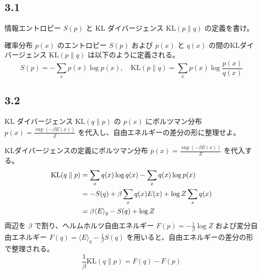 \documentclass[11pt,a4paper,dvipdfmx]{article}
\numberwithin{equation}{section}
\newenvironment{note}[0]
{
    \begin{tcolorbox}[sharp corners, colframe=gray!20, colback=gray!20, width=\textwidth]
}
{
    \end{tcolorbox}
}
\begin{document}
\subsection*{3.1}
\begin{note}
情報エントロピー $S(p)$ と KL ダイバージェンス $\text{KL}(p \parallel q)$ の定義を書け。
\end{note}
\begin{proofbox}
確率分布 $p(x)$ のエントロピー $S(p)$ および $p(x)$ と $q(x)$ の間のKLダイバージェンス $\text{KL}(p \parallel q)$ は以下のように定義される。
\begin{equation}
S(p) = - \sum_{x} p(x) \log p(x), \quad \text{KL}(p \parallel q) = \sum_{x} p(x) \log \frac{p(x)}{q(x)}
\end{equation}
\end{proofbox}

\subsection*{3.2}
\begin{note}
KL ダイバージェンス $\text{KL}(q \parallel p)$ の $p(x)$ にボルツマン分布 $p(x) = \frac{\exp(-\beta E(x))}{Z}$ を代入し、自由エネルギーの差分の形に整理せよ。
\end{note}
\begin{proofbox}
KLダイバージェンスの定義にボルツマン分布 $p(x) = \frac{\exp(-\beta E(x))}{Z}$ を代入する。
\begin{align}
\text{KL}(q \parallel p) &= \sum_{x} q(x) \log q(x) - \sum_{x} q(x) \log p(x) \notag \\
&= -S(q) + \beta \sum_{x} q(x) E(x) + \log Z \sum_{x} q(x) \notag \\
&= \beta \langle E \rangle_q - S(q) + \log Z
\end{align}
両辺を $\beta$ で割り、ヘルムホルツ自由エネルギー $F(p) = -\frac{1}{\beta}\log Z$ および変分自由エネルギー $F(q) = \langle E \rangle_q - \frac{1}{\beta}S(q)$ を用いると、自由エネルギーの差分の形で整理される。
\begin{equation}
\frac{1}{\beta} \text{KL}(q \parallel p) = F(q) - F(p)
\end{equation}
\end{proofbox}
\end{document}
